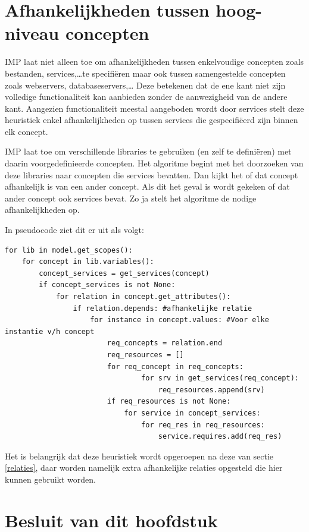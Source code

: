 \section{Afhankelijkheden tussen hoog-niveau concepten}
\label{hoog_niveau_relaties}
IMP laat niet alleen toe om afhankelijkheden tussen enkelvoudige concepten zoals bestanden, services,\ldots te specifi\"eren maar ook tussen samengestelde concepten zoals webservers, databaseservers,\ldots
Deze betekenen dat de ene kant niet zijn volledige functionaliteit kan aanbieden zonder de aanwezigheid van de andere kant.
Aangezien functionaliteit meestal aangeboden wordt door services stelt deze heuristiek enkel afhankelijkheden op tussen services die gespecifi\"eerd zijn binnen elk concept.

IMP laat toe om verschillende libraries te gebruiken (en zelf te defini\"eren) met daarin voorgedefinieerde concepten. 
Het algoritme begint met het doorzoeken van deze libraries naar concepten die services bevatten.
Dan kijkt het of dat concept afhankelijk is van een ander concept.
Als dit het geval is wordt gekeken of dat ander concept ook services bevat.
Zo ja stelt het algoritme de nodige afhankelijkheden op.

In pseudocode ziet dit er uit als volgt:

\begin{lstlisting}
for lib in model.get_scopes():
    for concept in lib.variables():
        concept_services = get_services(concept)
        if concept_services is not None:
            for relation in concept.get_attributes():
                if relation.depends: #afhankelijke relatie
                    for instance in concept.values: #Voor elke instantie v/h concept
                        req_concepts = relation.end
                        req_resources = []
                        for req_concept in req_concepts:
                                for srv in get_services(req_concept):
                                    req_resources.append(srv)
                        if req_resources is not None: 
                            for service in concept_services:
                                for req_res in req_resources:
                                    service.requires.add(req_res)
\end{lstlisting}

Het is belangrijk dat deze heuristiek wordt opgeroepen na deze van sectie \ref{relaties}, daar worden namelijk extra afhankelijke relaties opgesteld die hier kunnen gebruikt worden.
\section{Besluit van dit hoofdstuk}
